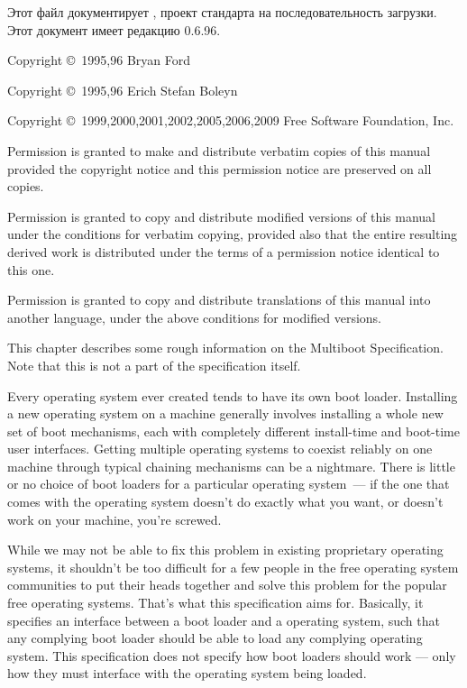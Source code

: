 Этот файл документирует , проект стандарта на последовательность загрузки.
Этот документ имеет редакцию 0.6.96.

Copyright \copyright\ 1995,96 Bryan Ford 

Copyright \copyright\ 1995,96 Erich Stefan Boleyn 

Copyright \copyright\ 1999,2000,2001,2002,2005,2006,2009 
Free Software Foundation, Inc.

Permission is granted to make and distribute verbatim copies of this manual
provided the copyright notice and this permission notice are preserved on all
copies.

Permission is granted to copy and distribute modified versions of this manual
under the conditions for verbatim copying, provided also that the entire
resulting derived work is distributed under the terms of a permission notice
identical to this one.

Permission is granted to copy and distribute translations of this manual into
another language, under the above conditions for modified versions.

\secdown

This chapter describes some rough information on the Multiboot Specification.
Note that this is not a part of the specification itself.


Every operating system ever created tends to have its own boot loader.
Installing a new operating system on a machine generally involves installing a
whole new set of boot mechanisms, each with completely different install-time
and boot-time user interfaces. Getting multiple operating systems to coexist
reliably on one machine through typical chaining mechanisms can be a nightmare.
There is little or no choice of boot loaders for a particular operating system\
--- if the one that comes with the operating system doesn't do exactly what you
want, or doesn't work on your machine, you're screwed.

While we may not be able to fix this problem in existing proprietary operating
systems, it shouldn't be too difficult for a few people in the free operating
system communities to put their heads together and solve this problem for the
popular free operating systems. That's what this specification aims for.
Basically, it specifies an interface between a boot loader and a operating
system, such that any complying boot loader should be able to load any complying
operating system. This specification does not specify how boot loaders should
work — only how they must interface with the operating system being loaded.

